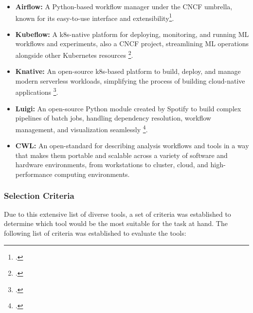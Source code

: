 \begin{itemize}
    \item \textbf{Airflow:} A Python-based workflow manager under the \ac{CNCF} umbrella, known for its easy-to-use interface and extensibility\footcite{hainesWorkflowOrchestrationApache2022}.
    \item \textbf{Kubeflow:} A \ac{k8s}-native platform for deploying, monitoring, and running ML workflows and experiments, also a \ac{CNCF} project, streamlining \ac{ML} operations alongside other Kubernetes resources \footcite{Kubeflow}.
    \item \textbf{Knative:} An open-source \ac{k8s}-based platform to build, deploy, and manage modern serverless workloads, simplifying the process of building cloud-native applications \footcite{HomeKnative}.
    \item \textbf{Luigi:} An open-source Python module created by Spotify to build complex pipelines of batch jobs, handling dependency resolution, workflow management, and visualization seamlessly \footcite{SpotifyLuigi2023}.
    \item \textbf{\ac{CWL}:} An open-standard for describing analysis workflows and tools in a way that makes them portable and scalable across a variety of software and hardware environments, from workstations to cluster, cloud, and high-performance computing environments.
\end{itemize}
    
\subsubsection{Selection Criteria}

Due to this extensive list of diverse tools, a set of criteria was established to determine which tool would be the most suitable for the task at hand.
The following list of criteria was established to evaluate the tools:

